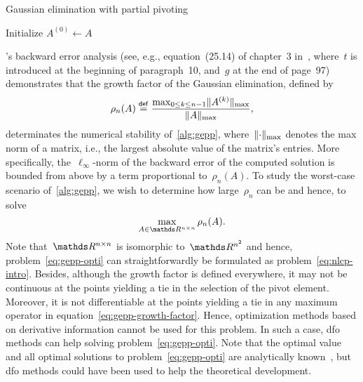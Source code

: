 \begin{algorithm}[ht]
    \caption{Gaussian elimination with partial pivoting}
    \label{alg:gepp}
    \DontPrintSemicolon
    Initialize $A^{(0)} \gets A$\;
\end{algorithm}

's backward error analysis (see, e.g., equation~(25.14) of chapter~3 in~\cite{Wilkinson_1963}, where~$t$ is introduced at the beginning of paragraph~10, and~$g$ at the end of page~97) demonstrates that the growth factor of the Gaussian elimination, defined by
\begin{equation}
    \label{eq:gepp-growth-factor}
    \rho_n(A) \mathrel{\stackrel{\mathsf{def}}{=}} \frac{\max_{0 \le k \le n - 1} \lVert A^{(k)}\rVert_{\max}}{\lVert A\rVert_{\max}},
\end{equation}
determinates the numerical stability of~\cref{alg:gepp}, where~$\lVert\cdot\rVert_{\max}$ denotes the max norm of a matrix, i.e., the largest absolute value of the matrix's entries.
More specifically, the~$\ell_{\infty}$-norm of the backward error of the computed solution is bounded from above by a term proportional to~$\rho_n(A)$.
To study the worst-case scenario of~\cref{alg:gepp}, we wish to determine how large~$\rho_n$ can be and hence, to solve
\begin{equation}
    \label{eq:gepp-opti}
    \max_{A \in \R^{n \times n}} \rho_n(A).
\end{equation}
Note that~$\R^{n \times n}$ is isomorphic to~$\R^{n^2}$ and hence, problem~\cref{eq:gepp-opti} can straightforwardly be formulated as problem~\cref{eq:nlcp-intro}.
Besides, although the growth factor is defined everywhere, it may not be continuous at the points yielding a tie in the selection of the pivot element.
Moreover, it is not differentiable at the points yielding a tie in any maximum operator in equation~\cref{eq:gepp-growth-factor}.
Hence, optimization methods based on derivative information cannot be used for this problem.
In such a case, \gls{dfo} methods can help solving problem~\cref{eq:gepp-opti}.
Note that the optimal value and all optimal solutions to problem~\cref{eq:gepp-opti} are analytically known~\cite{Higham_Higham_1989}, but \gls{dfo} methods could have been used to help the theoretical development.

